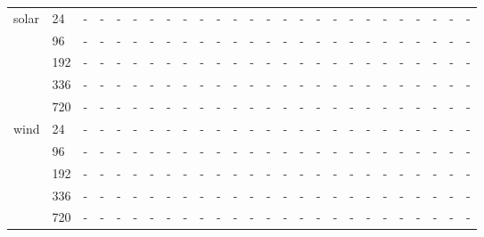 \begin{tabular}{llllllllllllllllllllllllll}
\multirow[t]{5}{*}{solar} & 24 & - & - & - & - & - & - & - & - & - & - & - & - & - & - & - & - & - & - & - & - & - & - & - & - \\
 & 96 & - & - & - & - & - & - & - & - & - & - & - & - & - & - & - & - & - & - & - & - & - & - & - & - \\
 & 192 & - & - & - & - & - & - & - & - & - & - & - & - & - & - & - & - & - & - & - & - & - & - & - & - \\
 & 336 & - & - & - & - & - & - & - & - & - & - & - & - & - & - & - & - & - & - & - & - & - & - & - & - \\
 & 720 & - & - & - & - & - & - & - & - & - & - & - & - & - & - & - & - & - & - & - & - & - & - & - & - \\
\cline{1-26}
\multirow[t]{5}{*}{wind} & 24 & - & - & - & - & - & - & - & - & - & - & - & - & - & - & - & - & - & - & - & - & - & - & - & - \\
 & 96 & - & - & - & - & - & - & - & - & - & - & - & - & - & - & - & - & - & - & - & - & - & - & - & - \\
 & 192 & - & - & - & - & - & - & - & - & - & - & - & - & - & - & - & - & - & - & - & - & - & - & - & - \\
 & 336 & - & - & - & - & - & - & - & - & - & - & - & - & - & - & - & - & - & - & - & - & - & - & - & - \\
 & 720 & - & - & - & - & - & - & - & - & - & - & - & - & - & - & - & - & - & - & - & - & - & - & - & - \\
\cline{1-26}
\bottomrule
\end{tabular}
